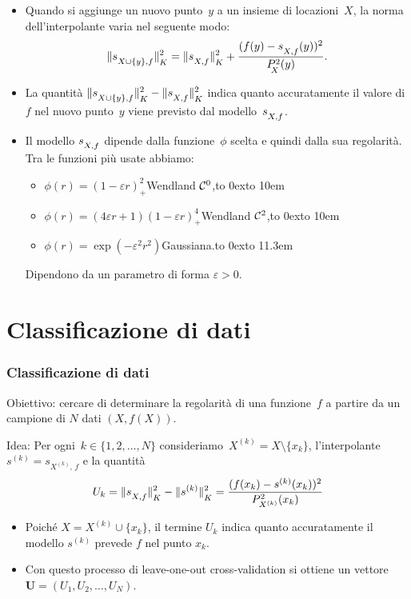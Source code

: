 \documentclass[10pt]{beamer}
\theoremstyle{definition}
\theoremstyle{plain}
\def\Cal#1{{\cal #1}}
\def\norm#1{\Vert #1\Vert}
\def\hbyw#1#2{\vbox to #1{\vfil \hbox to #2{\hfil}}}
\def\lK{{\lower.5ex\hbox{$\scriptstyle K$}}}
\def\lX{{\!\!\lower.5ex\hbox{$\scriptstyle X$}}}
\def\lXf{{\lower.5ex\hbox{$\scriptstyle X, f$}}}
\def\lXyf{{\lower.5ex\hbox{$\scriptstyle X\cup\{y\}, f$}}}
\begin{document}
\begin{frame}
\begin{itemize}
\item
 Quando si aggiunge un nuovo punto~$y$ a un insieme di locazioni~$X$, la norma dell’interpolante varia nel seguente modo:
$$
\norm{s_\lXyf}^2_\lK = \norm{s_\lXf}^2_\lK + \frac{(f(y) - s_\lXf(y))^2}{P^2_\lX(y)}.
$$
\item
La quantità $\norm{s_\lXyf}^2_\lK - \norm{s_\lXf}^2_\lK$ indica quanto accuratamente il valore di $f$ nel nuovo punto~$y$ viene previsto dal modello~$s_\lXf$.

\item
Il modello $s_\lXf$ dipende dalla funzione~$\phi$ scelta e quindi dalla sua regolarità.  Tra le funzioni più usate abbiamo:
\begin{itemize}
\item $\phi(r) =  (1- \varepsilon r)_+^2$\hfill Wendland $\Cal C^0$,\hbyw{0ex}{10em}
\item $\phi(r) = (4\varepsilon r+1)(1-\varepsilon r)^4_+$\hfill Wendland $\Cal C^2$,\hbyw{0ex}{10em}
\item $\phi(r) = \exp(-\varepsilon^2 r^2)$\hfill Gaussiana.\hbyw{0ex}{11.3em}
\end{itemize}
Dipendono da un parametro di forma $\varepsilon>0$.
\end{itemize}
\end{frame}



\section{Classificazione di dati}
\begin{frame}
\frametitle{Classificazione di dati}
\alert{Obiettivo}: cercare di determinare la regolarità di una funzione~$f$ a partire da un campione di $N$ dati $(X, f(X))$.
\bigskip

\alert{Idea}: Per ogni~$k\in\{1,2,\dots, N\}$ consideriamo~$X^{(k)} = X\setminus \{x_k\}$, l’interpolante $s^{(k)} = s_{X^{(k)}\!,\, f}$ e la quantità
$$
U_k = \norm{s_\lXf}^2_\lK - \norm{s^{(k)}}^2_\lK = \frac{(f(x_k) - s^{(k)}(x_k))^2}{P^2_{X^{(k)}}(x_k)}
$$
\begin{itemize}
\item
Poiché $X=X^{(k)}\cup\{x_k\}$, il termine $U_k$
indica quanto accuratamente il modello $s^{(k)}$ prevede $f$ nel punto $x_k$.
\item
Con questo processo di \alert{leave-one-out cross-validation} si ottiene  un vettore $\bm U = (U_1,U_2,\dots, U_N)$.
\end{itemize}
\end{frame}
\end{document}
